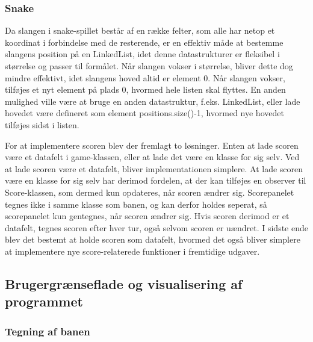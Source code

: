 \documentclass{report}
\begin{document}
\subsubsection{Snake}
Da slangen i snake-spillet består af en række felter, som alle har netop et koordinat i forbindelse med de resterende, er en effektiv måde at bestemme slangens position på en LinkedList, idet denne datastrukturer er fleksibel i størrelse og passer til formålet. Når slangen vokser i størrelse, bliver dette dog mindre effektivt, idet slangens hoved altid er element 0. Når slangen vokser, tilføjes et nyt element på plads 0, hvormed hele listen skal flyttes. En anden mulighed ville være at bruge en anden datastruktur, f.eks. LinkedList, eller lade hovedet være defineret som element positions.size()-1, hvormed nye hovedet tilføjes sidst i listen.

For at implementere scoren blev der fremlagt to løsninger. Enten at lade scoren være et datafelt i game-klassen, eller at lade det være en klasse for sig selv. Ved at lade scoren være et datafelt, bliver implementationen simplere. At lade scoren være en klasse for sig selv har derimod fordelen, at der kan 
tilføjes en observer til Score-klassen, som dermed kun opdateres, når scoren ændrer sig. Scorepanelet tegnes ikke i samme klasse som banen, og kan derfor holdes seperat, så scorepanelet kun gentegnes, når scoren ændrer sig. Hvis scoren derimod er et datafelt, tegnes scoren efter hver tur, også selvom scoren er uændret. I sidste ende blev det bestemt at holde scoren som datafelt, hvormed det også bliver simplere at implementere nye score-relaterede funktioner i fremtidige udgaver.

\subsection{Brugergrænseflade og visualisering af programmet}
\subsubsection{Tegning af banen}
\end{document}
